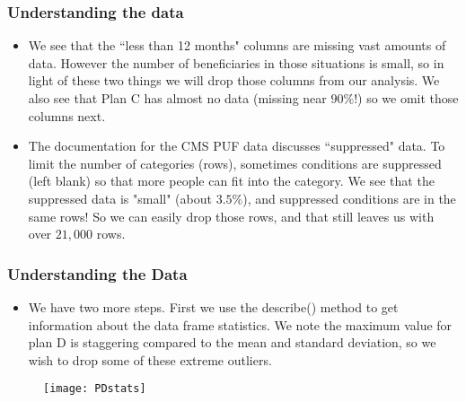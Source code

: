 \documentclass{beamer}
\begin{document}
\begin{frame}

\frametitle{Understanding the data}

\begin{itemize}

\item We see that the ``less than 12 months" columns are missing vast amounts of data. However the number of beneficiaries in those situations is small, so in light of these two things we will drop those columns from our analysis. We also see that Plan C has almost no data (missing near $90\%$!) so we omit those columns next.

\item The documentation for the CMS PUF data discusses ``suppressed" data. To limit the number of categories (rows), sometimes conditions are suppressed (left blank) so that more people can fit into the category. We see that the suppressed data is "small" (about $3.5\%$), and suppressed conditions are in the same rows! So we can easily drop those rows, and that still leaves us with over $21,000$ rows.

\end{itemize}




\end{frame}


\begin{frame}

\frametitle{Understanding the Data}

\begin{itemize}

\item We have two more steps. First we use the describe() method to get information about the data frame statistics. We note the maximum value for plan D is staggering compared to the mean and standard deviation, so we wish to drop some of these extreme outliers. 

\end{itemize}

\begin{figure}
\texttt{[image: PDstats]}
\end{figure}




\end{frame}

\end{document}
